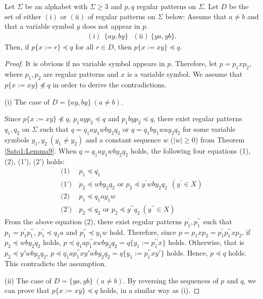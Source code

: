 \begin{lem}\label{変数2つ}
Let $\Sigma$ be an alphabet with $\Sigma \ge 3$ and $p,q$ regular patterns on $\Sigma$.
Let $D$ be the set of either $(\mathrm{i})$ or $(\mathrm{ii})$ of regular patterns on $\Sigma$ below: Assume that $a \not= b$ and that a variable symbol $y$ does not appear in $p$.
\begin{align*}
(\mathrm{i})~~\{ ay, by \}~~~(\mathrm{ii})~\{ ya, yb \}.
\end{align*}
Then, if $p \{ x := r \} \preceq q$ for all $r \in D$, then $p \{ x := xy \} \preceq q$.
\end{lem}
\begin{proof}
It is obvious if no variable symbol appears in $p$. 
Therefore, let $p=p_{1}xp_{2}$, where $p_{1}, p_{2}$ are regular patterns and $x$ is a variable symbol.
We assume that $p \{ x := xy \} \not \preceq q$ in order to derive the contradictions.

\noindent
(i) 
The case of $D=\{ ay, by \} \ (a \ne b)$.

\noindent
Since $p \{ x := xy \} \not \preceq q$, $p_{1}ayp_{2}\preceq q$ and $p_{1}byp_{2}\preceq q$, 
there exist regular patterns $q_{1},q_{2}$ on $\Sigma$ such that $q=q_{1}ay_{1}wby_{2}q_{2}$ or $q=q_{1}by_{1}way_{2}q_{2}$ for some variable symbols $y_{1},y_{2}~(y_{1} \not= y_{2})$ and a constant sequence $w$ ($|w|\geq 0$) from Theorem \ref{Sato1:Lemma9}.
When $q=q_{1}ay_{1}wby_{2}q_{2}$ holds, the following four equations (1), (2), (1'), (2') holds:
\begin{align*}
\textrm{(1)} & ~p_{1} \preceq q_{1}\\
\textrm{(1')} & ~p_{2} \preceq wby_{2}q_{2} \mbox{ or } p_{2} \preceq y^{\prime}wby_{2}q_{2} ~~(y^{\prime} \in X)\\
\textrm{(2)} & ~p_{1} \preceq q_{1}ay_{1}w\\
\textrm{(2')} & ~p_{2} \preceq q_{2} \mbox{ or } p_{2} \preceq y^{\prime\prime}q_{2} ~(y^{\prime\prime} \in X)
\end{align*}
From the above equation (2), there exist regular patterns $p_{1}^{\prime},p_{1}^{\prime\prime}$ such that $p_{1}=p_{1}^{\prime}p_{1}^{\prime\prime}$, $p_{1}^{\prime} \preceq q_{1}a$ and $p_{1}^{\prime\prime} \preceq y_{1}w$ hold.
Therefore, since $p=p_{1}xp_{2}=p_{1}^{\prime}p_{1}^{\prime\prime}xp_{2}$,
if $p_{2} \preceq wby_{2}q_{2}$ holds, 
$p\preceq q_{1}ap_{1}^{\prime\prime}xwby_{2}q_{2}=q \{ y_{1} := p_{1}^{\prime\prime}x \}$ holds.
Otherwise, that is $p_2\preceq y'wby_{2}q_{2}$, $p\preceq q_{1}ap_{1}^{\prime\prime}xy'wby_{2}q_{2}=q \{ y_{1} := p_{1}^{\prime\prime}xy' \}$ holds.
Hence, $p \preceq q$ holds.
This contradicts the assumption.

\noindent
(ii) 
The case of $D=\{ ya, yb \} \ (a \ne b)$.
By reversing the sequences of $p$ and $q$, we can prove that $p \{ x := xy \} \preceq q$ holds, in a similar way as (i).
\end{proof}


